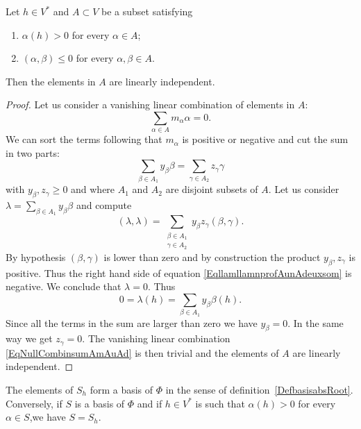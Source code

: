\begin{lemma}        \label{LemIndepAhVstar}
    Let \( h\in V^*\) and \( A\subset V\) be a subset satisfying
    \begin{enumerate}
        \item
            \( \alpha(h)>0\) for every \( \alpha\in A\);
        \item
            \( (\alpha,\beta)\leq 0\) for every \( \alpha,\beta\in A\).
    \end{enumerate}
    Then the elements in \( A\) are linearly independent.
\end{lemma}

\begin{proof}
    Let us consider a vanishing linear combination of elements in \( A\):
    \begin{equation}        \label{EqNullCombinsumAmAuAd}
        \sum_{\alpha\in A}m_{\alpha}\alpha=0.
    \end{equation}
    We can sort the terms following that \( m_{\alpha}\) is positive or negative and cut the sum in two parts:
    \begin{equation}
        \sum_{\beta\in A_1}y_{\beta}\beta=\sum_{\gamma\in A_2}z_{\gamma}\gamma
    \end{equation}
    with \( y_{\beta},z_{\gamma}\geq 0\) and where \( A_1\) and \( A_2\) are disjoint subsets of \( A\). Let us consider \( \lambda=\sum_{\beta\in A_1}y_{\beta}\beta\) and compute
    \begin{equation}        \label{EqllamllamnprofAunAdeuxsom}
        (\lambda,\lambda)=\sum_{\substack{\beta\in A_1\\\gamma\in A_2}}y_{\beta}z_{\gamma}(\beta,\gamma).
    \end{equation}
    By hypothesis \( (\beta,\gamma)\) is lower than zero and by construction the product \( y_{\beta},z_{\gamma}\) is positive. Thus the right hand side of equation \eqref{EqllamllamnprofAunAdeuxsom} is negative. We conclude that \( \lambda=0\). Thus
    \begin{equation}
        0=\lambda(h)=\sum_{\beta\in A_1}y_{\beta}\beta(h).
    \end{equation}
    Since all the terms in the sum are larger than zero we have \( y_{\beta}=0\). In the same way we get \( z_{\gamma}=0\). The vanishing linear combination \eqref{EqNullCombinsumAmAuAd} is then trivial and the elements of \( A\) are linearly independent.
\end{proof}

\begin{proposition}\label{PropSestShsi}
    The elements of \( S_h\) form a basis of \( \Phi\) in the sense of definition~\ref{DefbasisabsRoot}. Conversely, if \( S\) is a basis of \( \Phi\) and if \( h\in V^*\) is such that \( \alpha(h)>0\) for every \( \alpha\in S\),we have \( S=S_h\).
\end{proposition}

